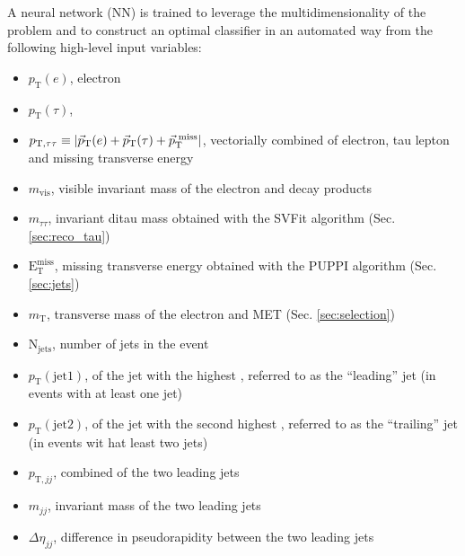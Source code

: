 A neural network (NN) is trained to leverage the multidimensionality of the problem and to construct an optimal classifier in an automated way from the following high-level input variables: 
\begin{itemize}
    \item $p_\text{T}(e)$, electron \pt
    \item $p_\text{T}(\tau)$, \tauh \pt 
    \item $p_{\text{T}, \tau\tau} \equiv |\vec{p}_{\text{T}}(e) + \vec{p}_{\text{T}}(\tau) + \vec{p}_\text{T}^{\text{ miss}}|$, vectorially combined \pt of electron, tau lepton and missing transverse energy 
    \item $m_\text{vis}$, visible invariant mass of the electron and \tauh decay products 
    \item $m_{\tau\tau}$, invariant ditau mass obtained with the SVFit algorithm (Sec. \ref{sec:reco_tau})
    \item $\text{E}_\text{T}^\text{miss}$, missing transverse energy obtained with the PUPPI algorithm (Sec. \ref{sec:jets})
    \item $m_\text{T}$, transverse mass of the electron and MET (Sec. \ref{sec:selection})
    \item $\text{N}_\text{jets}$, number of jets in the event
    \item $p_\text{T}(\text{jet1})$, \pt of the jet with the highest \pt, referred to as the \enquote{leading} jet (in events with at least one jet)
    \item $p_\text{T}(\text{jet2})$, \pt of the jet with the second highest \pt, referred to as the \enquote{trailing} jet (in events wit hat least two jets)
    \item $p_{\text{T}, jj}$, combined \pt of the two leading jets 
    \item $m_{jj}$, invariant mass of the two leading jets 
    \item $\Delta\eta_{jj}$, difference in pseudorapidity between the two leading jets
\end{itemize}

